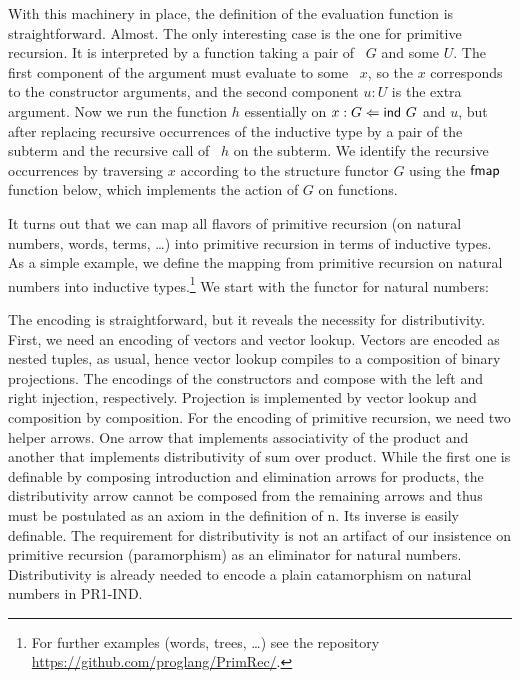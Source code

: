 \documentclass[a4paper,USenglish,cleveref, autoref, thm-restate]{lipics-v2021}
\begin{document}
With this machinery in place, the definition of the evaluation
function is straightforward. Almost.
\ccFunEval
The only interesting case is the one for primitive recursion. It is
interpreted by a function taking a pair of \Aind~$G$ and some $U$. The
first component of the argument must evaluate to some \Afold~$x$, so the $x$ corresponds
to the constructor arguments, and the second component $u:U$ is the
extra argument. Now we run the function $h$ essentially on
$x :{} G \Leftarrow \Aind~G$ and $u$, but 
after replacing recursive occurrences of the inductive type by a pair
of the subterm and the recursive call of {\AP}~$h$ on the subterm. We
identify the recursive occurrences by traversing $x$ according to the
structure functor $G$ using the $\Afmap$ function below, which
implements the action of $G$ on functions. 
\ccFunFmapSignature
\ccFunFmap

It turns out that we can map all flavors of primitive recursion (on
natural numbers, words, terms, \dots) into primitive recursion in terms
of inductive types.
As a simple example, we define the mapping from primitive recursion on
natural numbers into inductive types.\footnote{For further examples
  (words, trees, \dots)
  see the repository \url{https://github.com/proglang/PrimRec/}.} We
start with the functor {\AGNat} for natural numbers:
\ccDefGNat

The encoding is straightforward, but it reveals the necessity for
distributivity. First, we need an 
encoding of vectors and vector lookup. Vectors are encoded as nested
tuples, as usual, hence vector lookup compiles to a composition of
binary projections.
\ccFunMkvec
\ccDefNatToInd
The encodings of the constructors {\ACZ} and {\ACS} compose {\Afold} with the left and right
injection, respectively. Projection is implemented by vector lookup
and composition by composition. For
the encoding of primitive recursion, we need two helper arrows. One
arrow that implements associativity of the product and another that
implements distributivity of sum over product. While the first one is
definable by composing introduction and elimination arrows for
products,  the distributivity arrow cannot be composed from the
remaining arrows and thus must be postulated as an axiom in the
definition of {\APR n}. Its inverse is easily definable.
\ccFunAssocDist
The requirement for distributivity is not an artifact of our
insistence on primitive recursion (paramorphism) as an eliminator for
natural numbers. Distributivity is already needed to encode a plain
catamorphism on natural numbers in PR1-IND.
\end{document}
